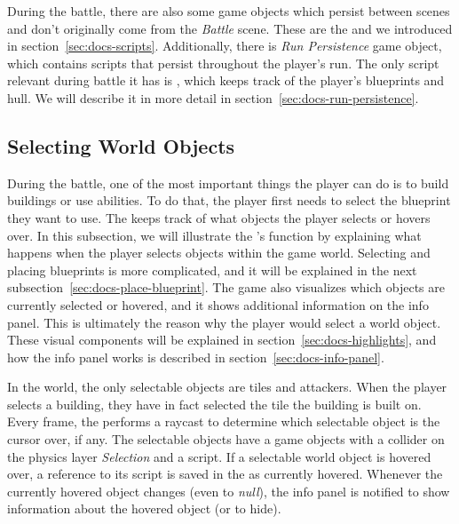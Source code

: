 During the battle, there are also some game objects which persist between scenes and don't originally come from the \emph{Battle} scene.
These are the  and  we introduced in section~\ref{sec:docs-scripts}.
Additionally, there is \emph{Run Persistence} game object, which contains scripts that persist throughout the player's run.
The only script relevant during battle it has is , which keeps track of the player's blueprints and hull.
We will describe it in more detail in section~\ref{sec:docs-run-persistence}.

\subsection{Selecting World Objects}

During the battle, one of the most important things the player can do is to build buildings or use abilities.
To do that, the player first needs to select the blueprint they want to use.
The  keeps track of what objects the player selects or hovers over.
In this subsection, we will illustrate the 's function by explaining what happens when the player selects objects within the game world.
Selecting and placing blueprints is more complicated, and it will be explained in the next subsection~\ref{sec:docs-place-blueprint}.
The game also visualizes which objects are currently selected or hovered, and it shows additional information on the info panel.
This is ultimately the reason why the player would select a world object.
These visual components will be explained in section~\ref{sec:docs-highlights}, and how the info panel works is described in section~\ref{sec:docs-info-panel}.

In the world, the only selectable objects are tiles and attackers.
When the player selects a building, they have in fact selected the tile the building is built on.
Every frame, the  performs a raycast to determine which selectable object is the cursor over, if any.
The selectable objects have a game objects with a collider on the physics layer \emph{Selection} and a  script.
If a selectable world object is hovered over, a reference to its  script is saved in the  as currently hovered.
Whenever the currently hovered object changes (even to \emph{null}), the info panel is notified to show information about the hovered object (or to hide).

